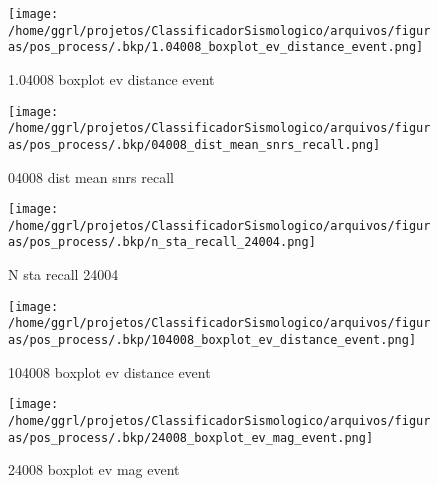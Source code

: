                     \begin{figure}[H]
                        \centering
                        \texttt{[image: /home/ggrl/projetos/ClassificadorSismologico/arquivos/figuras/pos\_process/.bkp/1.04008\_boxplot\_ev\_distance\_event.png]}
                        \caption{1.04008 boxplot ev distance event}
                        \label{fig:1.04008_boxplot_ev_distance_event}
                    \end{figure}
                

                    \begin{figure}[H]
                        \centering
                        \texttt{[image: /home/ggrl/projetos/ClassificadorSismologico/arquivos/figuras/pos\_process/.bkp/04008\_dist\_mean\_snrs\_recall.png]}
                        \caption{04008 dist mean snrs recall}
                        \label{fig:04008_dist_mean_snrs_recall}
                    \end{figure}
                

                    \begin{figure}[H]
                        \centering
                        \texttt{[image: /home/ggrl/projetos/ClassificadorSismologico/arquivos/figuras/pos\_process/.bkp/n\_sta\_recall\_24004.png]}
                        \caption{N sta recall 24004}
                        \label{fig:n_sta_recall_24004}
                    \end{figure}
                

                    \begin{figure}[H]
                        \centering
                        \texttt{[image: /home/ggrl/projetos/ClassificadorSismologico/arquivos/figuras/pos\_process/.bkp/104008\_boxplot\_ev\_distance\_event.png]}
                        \caption{104008 boxplot ev distance event}
                        \label{fig:104008_boxplot_ev_distance_event}
                    \end{figure}
                

                    \begin{figure}[H]
                        \centering
                        \texttt{[image: /home/ggrl/projetos/ClassificadorSismologico/arquivos/figuras/pos\_process/.bkp/24008\_boxplot\_ev\_mag\_event.png]}
                        \caption{24008 boxplot ev mag event}
                        \label{fig:24008_boxplot_ev_mag_event}
                    \end{figure}
                


